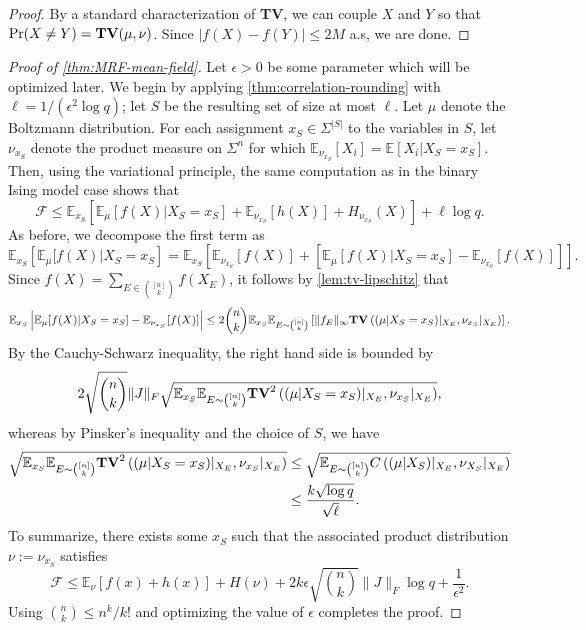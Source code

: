 \documentclass[11pt, oneside, english]{article}
\newcommand{\bE}{\mathbb{E}}
\newcommand{\F}{\mathcal{F}}
\newcommand{\E}{\bE}      %
\newcommand{\TV}{{\bf TV}}
\theoremstyle{definition}
\theoremstyle{plain}
\begin{document}
\begin{proof}
By a standard characterization of \TV, we can couple $X$ and $Y$ so that $\Pr(X \ne Y) = \TV(\mu,\nu)$. Since $|f(X) - f(Y)| \le 2M$ a.s, we are done. 
\end{proof}
\begin{proof}[Proof of \cref{thm:MRF-mean-field}]
Let $\epsilon > 0$ be some parameter which will be optimized later. We begin by applying \cref{thm:correlation-rounding} with $\ell = 1/(\epsilon^2 \log{q})$; let $S$ be the resulting set of size at most $\ell$. Let $\mu$ denote the Boltzmann distribution. For each assignment $x_S \in \Sigma^{|S|}$ to the variables in $S$, let $\nu_{x_S}$ denote the product measure on $\Sigma^{n}$ for which $\E_{\nu_{x_S}}[X_i] = \E[X_i|X_S = x_S]$. Then, using the variational principle, the same computation as in the binary Ising model case shows that
$$\F \leq \E_{x_S}\left[\E_{\mu}[f(X)|X_S=x_S]+\E_{\nu_{x_S}}[h(X)]+H_{\nu_{x_S}}(X)\right] + \ell \log{q}.$$
As before, we decompose the first term as
$$\E_{x_S}\left[\E_{\mu}[f(X)|X_S=x_S\right] = \E_{x_S}\left[\E_{\nu_{x_S}}[f(X)] + \left[\E_{\mu}[f(X)|X_S = x_S]-\E_{\nu_{x_S}}[f(X)]\right]\right].$$
Since $f(X) = \sum_{E \in \binom{[n]}{k}}f(X_E)$, it follows by \cref{lem:tv-lipschitz} that
\begin{align*}
\E_{x_S}\left|\E_{\mu}[f(X)|X_S = x_S]-\E_{\nu_{x_S}}[f(X)]\right| \leq 2\binom{n}{k}\E_{x_S}\E_{E \sim \binom{[n]}{k}}\left[\|f_E\|_\infty \TV\left((\mu|X_S=x_S)|_{X_E},\nu_{x_S}|_{X_E}\right)\right].
\end{align*}
By the Cauchy-Schwarz inequality, the right hand side is bounded by
$$2 \sqrt{\binom{n}{k}} \|J\|_{F}\sqrt{\E_{x_S}\E_{E \sim \binom{[n]}{k}}\TV^{2}\left((\mu|X_S=x_S)|_{X_E},\nu_{x_S}|_{X_E}\right)},$$
whereas by Pinsker's inequality and the choice of $S$, we have
\begin{align*}
\sqrt{\E_{x_S}\E_{E \sim \binom{[n]}{k}}\TV^{2}\left((\mu|X_S=x_S)|_{X_E},\nu_{x_S}|_{X_E}\right)}
&\leq \sqrt{\E_{E \sim \binom{[n]}{k}}C\left((\mu|X_S)|_{X_E},\nu_{X_S}|_{X_E}\right)}\\
&\leq \frac{k\sqrt{\log{q}}}{\sqrt{\ell}}.
\end{align*}
To summarize, there exists some $x_S$ such that the associated product distribution $\nu:=\nu_{x_S}$ satisfies
\begin{equation}
\label{eqn:bound-with-epsilon}
\F \leq \E_{\nu}[f(x)+h(x)]+H(\nu) + 2k\epsilon \sqrt{\binom{n}{k}} \|J\|_{F}\log{q} + \frac{1}{\epsilon^2}.
\end{equation}
Using ${n \choose k} \le n^k/k!$
and optimizing the value of $\epsilon$ completes the proof.
\end{proof}
 
\end{document}
